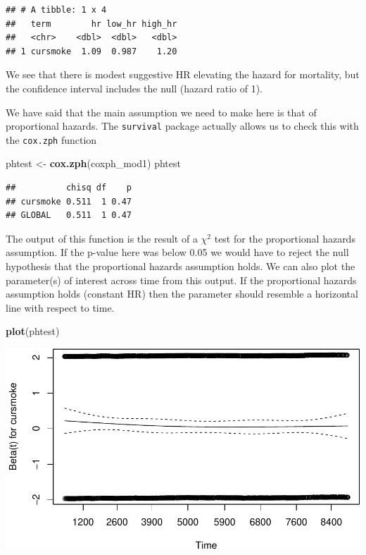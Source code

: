 \documentclass[
]{book}
\newenvironment{Shaded}{\begin{snugshade}}{\end{snugshade}}
\newcommand{\KeywordTok}[1]{\textcolor[rgb]{0.13,0.29,0.53}{\textbf{#1}}}
\newcommand{\NormalTok}[1]{#1}
\newcommand{\StringTok}[1]{\textcolor[rgb]{0.31,0.60,0.02}{#1}}
\begin{document}
\begin{verbatim}
## # A tibble: 1 x 4
##   term        hr low_hr high_hr
##   <chr>    <dbl>  <dbl>   <dbl>
## 1 cursmoke  1.09  0.987    1.20
\end{verbatim}

We see that there is modest suggestive HR elevating the hazard for mortality, but the confidence interval includes the null (hazard ratio of 1).

We have said that the main assumption we need to make here is that of proportional hazards. The \texttt{survival} package actually allows us to check this with the \texttt{cox.zph} function

\begin{Shaded}
\begin{Highlighting}[]
\NormalTok{phtest <-}\StringTok{ }\KeywordTok{cox.zph}\NormalTok{(coxph_mod1)}
\NormalTok{phtest}
\end{Highlighting}
\end{Shaded}

\begin{verbatim}
##          chisq df    p
## cursmoke 0.511  1 0.47
## GLOBAL   0.511  1 0.47
\end{verbatim}

The output of this function is the result of a \(\chi^2\) test for the proportional hazards assumption. If the p-value here was below 0.05 we would have to reject the null hypothesis that the proportional hazards assumption holds.
We can also plot the parameter(s) of interest across time from this output. If the proportional hazards assumption holds (constant HR) then the parameter should resemble a horizontal line with respect to time.

\begin{Shaded}
\begin{Highlighting}[]
\KeywordTok{plot}\NormalTok{(phtest)}
\end{Highlighting}
\end{Shaded}

\includegraphics{adv_epi_analysis_files/figure-latex/unnamed-chunk-210-1.pdf}
\end{document}
